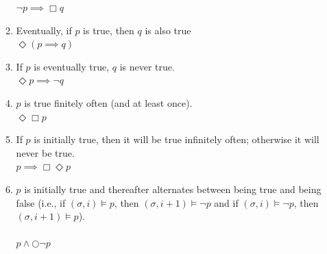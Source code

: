 \documentclass{article}
\newcommand{\Next}{\bigcirc}
\begin{document}
\begin{enumerate}
\begin{enumerate}
  $\neg p \implies \Box q $ 
\item Eventually, if $p$ is true, then $q$ is also true \\
  $ \Diamond (p \implies q) $
\item If $p$ is eventually true, $q$ is never true. \\
  $ \Diamond p \implies \neg q $
\item $p$ is true finitely often (and at least once). \\
  $\Diamond \Box p$
\item If $p$ is initially true, then it will be true infinitely often; otherwise it will never be true. \\
  $p \implies \Box \Diamond p$ 
\item $p$ is initially true and thereafter alternates between being true and being false (i.e., if $(\sigma,i)\models p$, then $(\sigma,i+1)\models \neg p$ and if $(\sigma,i)\models \neg p$, then $(\sigma,i+1)\models p$). \\
  \\
  $p \land \Next \neg p$
  
\end{enumerate}

\end{enumerate}
\end{document}

